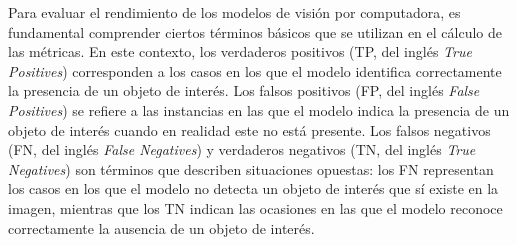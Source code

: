 Para evaluar el rendimiento de los modelos de visión por computadora, es fundamental comprender ciertos términos básicos que se utilizan en el cálculo de las métricas. En este contexto, los verdaderos positivos (TP, del inglés \textit{True Positives}) corresponden a los casos en los que el modelo identifica correctamente la presencia de un objeto de interés. Los falsos positivos (FP, del inglés \textit{False Positives}) se refiere a las instancias en las que el modelo indica la presencia de un objeto de interés cuando en realidad este no está presente. Los falsos negativos (FN, del inglés \textit{False Negatives}) y verdaderos negativos (TN, del inglés \textit{True Negatives}) son términos que describen situaciones opuestas: los FN representan los casos en los que el modelo no detecta un objeto de interés que sí existe en la imagen, mientras que los TN indican las ocasiones en las que el modelo reconoce correctamente la ausencia de un objeto de interés.


